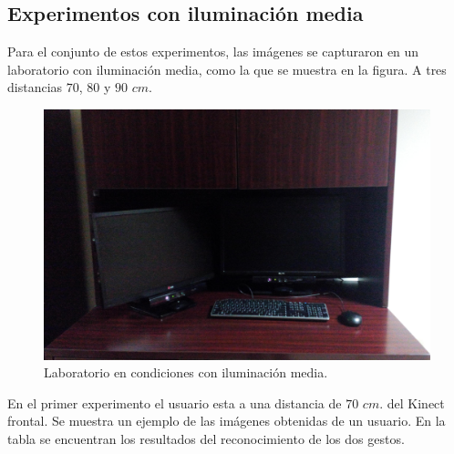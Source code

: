 \subsection{Experimentos con iluminación media} 
Para el conjunto de estos experimentos, las imágenes se capturaron en un laboratorio con iluminación media, como la que se muestra en la figura. A tres distancias $70$, $80$ y $90$ $cm$.  

\begin{figure}[h!]
\begin{center} 
\includegraphics[scale=0.09]{./Figures/mediailuminacion.jpg}
\end{center}
\caption{Laboratorio en condiciones con iluminación media.}
\label{fig:LabMedioIluminado} 
\end{figure}  

En el primer experimento el usuario esta a una distancia de $70$ $cm.$ del Kinect frontal. Se muestra un ejemplo de las imágenes obtenidas de un usuario. En la tabla se encuentran los resultados del reconocimiento de los dos gestos.  

